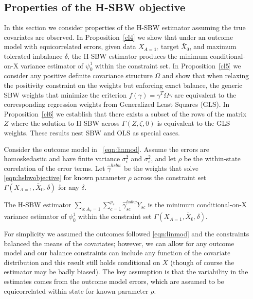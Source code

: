 \subsection{Properties of the H-SBW objective}\label{app:AsecII}
    In this section we consider properties of the H-SBW estimator assuming the true covariates are observed. In Proposition~\ref{cl4} we show that under an outcome model with equicorrelated errors, given data $X_{A=1}$, target $\bar{X}_0$, and maximum tolerated imbalance $\delta$, the H-SBW estimator produces the minimum conditional-on-X variance estimator of $\psi_0^1$ within the constraint set. In Proposition~\ref{cl5} we consider any positive definite covariance structure $\Omega$ and show that when relaxing the positivity constraint on the weights but enforcing exact balance, the generic SBW weights that minimize the criterion $f(\gamma) = \gamma^T\Omega\gamma$ are equivalent to the corresponding regression weights from Generalized Least Squares (GLS). In Proposition~\ref{cl6} we establish that there exists a subset of the rows of the matrix $Z$ where the solution to H-SBW across $\Gamma(Z, \zeta, 0)$ is equivalent to the GLS weights. These results nest SBW and OLS as special cases.

\begin{proposition}\label{cl4}
    Consider the outcome model in ~\eqref{eqn:linmod}. Assume the errors are homoskedastic and have finite variance $\sigma^2_{\epsilon}$ and $\sigma^2_{\varepsilon}$, and let $\rho$ be the within-state correlation of the error terms. Let $\hat{\gamma}^{hsbw}$ be the weights that solve \eqref{eqn:hsbwobjective} for known parameter $\rho$ across the constraint set $\Gamma(X_{A=1}, \bar{X}_0, \delta)$ for any $\delta$. 
    
    The H-SBW estimator $\sum_{s: A_s = 1}\sum_{c=1}^{p_s}\hat{\gamma}_{sc}^{hsbw}Y_{sc}$ is the minimum conditional-on-X variance estimator of $\psi_0^1$ within the constraint set $\Gamma(X_{A=1}, \bar{X}_0, \delta)$.
\end{proposition}


\begin{remark}
    For simplicity we assumed the outcomes followed \eqref{eqn:linmod} and the constraints balanced the means of the covariates; however, we can allow for any outcome model and our balance constraints can include any function of the covariate distribution and this result still holds conditional on $X$ (though of course the estimator may be badly biased). The key assumption is that the variability in the estimates comes from the outcome model errors, which are assumed to be equicorrelated within state for known parameter $\rho$.
\end{remark}

